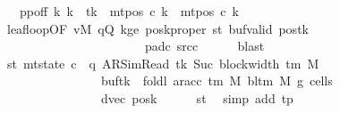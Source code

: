 \begin{isabellebody}
\ \ \ pp{}off{\isacharcolon}{\kern0pt}\ {\isachardoublequoteopen}{\isasymforall}k{\isacharprime}{\kern0pt}{\isachardot}{\kern0pt}\ k{\isacharprime}{\kern0pt}\ {\isasymnoteq}\ tk\ {\isasymlongrightarrow}\ mt{\isacharunderscore}{\kern0pt}pos\ c{}\ k{\isacharprime}{\kern0pt}\ {\isacharequal}{\kern0pt}\ mt{\isacharunderscore}{\kern0pt}pos\ c{}\ k{\isacharprime}{\kern0pt}{\isachardoublequoteclose}\isanewline
\ \ \ \ \isamarkupfalse%
\ leaf{\isacharunderscore}{\kern0pt}loop{\isacharbrackleft}{\kern0pt}OF\ vM\ qQ\ kge{}\ posk{\isacharprime}{\kern0pt}{\isacharunderscore}{\kern0pt}proper\ st{}{\isacharprime}{\kern0pt}\ buf{}{\isacharunderscore}{\kern0pt}valid\ pos{}{\isacharunderscore}{\kern0pt}tk\isanewline
\ \ \ \ \ \ \ \ \ \ \ \ \ \ \ \ \ \ \ \ \ \ \ pad{\isacharunderscore}{\kern0pt}c{}\ src{\isacharunderscore}{\kern0pt}c{}{\isacharbrackright}{\kern0pt}\isanewline
\ \ \ \ \isamarkupfalse%
\ blast\isanewline
\ \ \isamarkupfalse%
\ st{}{\isacharprime}{\kern0pt}{\isacharcolon}{\kern0pt}\ {\isachardoublequoteopen}mt{\isacharunderscore}{\kern0pt}state\ c{}\ {\isacharequal}{\kern0pt}\ {\isacharparenleft}{\kern0pt}q{\isacharcomma}{\kern0pt}\ AR{\isacharunderscore}{\kern0pt}SimRead{\isacharcomma}{\kern0pt}\ tk{\isacharcomma}{\kern0pt}\ Suc\ {\isacharparenleft}{\kern0pt}block{\isacharunderscore}{\kern0pt}width\ {\isacharparenleft}{\kern0pt}{\isasymGamma}{\isacharunderscore}{\kern0pt}tm\ M{\isacharparenright}{\kern0pt}{\isacharparenright}{\kern0pt}{\isacharcomma}{\kern0pt}\isanewline
\ \ \ \ \ \ \ \ \ \ \ \ \ \ \ \ buf{\isacharparenleft}{\kern0pt}tk\ {\isacharcolon}{\kern0pt}{\isacharequal}{\kern0pt}\ foldl\ {\isacharparenleft}{\kern0pt}ar{\isacharunderscore}{\kern0pt}acc\ {\isacharparenleft}{\kern0pt}{\isasymGamma}{\isacharunderscore}{\kern0pt}tm\ M{\isacharparenright}{\kern0pt}\ {\isacharparenleft}{\kern0pt}bl{\isacharunderscore}{\kern0pt}tm\ M{\isacharparenright}{\kern0pt}{\isacharparenright}{\kern0pt}\ {\isacharquery}{\kern0pt}g{}\ {\isacharquery}{\kern0pt}cells{}{\isacharparenright}{\kern0pt}{\isacharcomma}{\kern0pt}\isanewline
\ \ \ \ \ \ \ \ \ \ \ \ \ \ \ \ dvec{\isacharcomma}{\kern0pt}\ {\isacharquery}{\kern0pt}posk{\isacharprime}{\kern0pt}{\isacharparenright}{\kern0pt}{\isachardoublequoteclose}\isanewline
\ \ \ \ \isamarkupfalse%
\ st{}\ \isamarkupfalse%
\ {\isacharparenleft}{\kern0pt}simp\ add{\isacharcolon}{\kern0pt}\ tp{}{\isacharprime}{\kern0pt}{\isacharparenright}{\kern0pt}\isanewline

\end{isabellebody}
